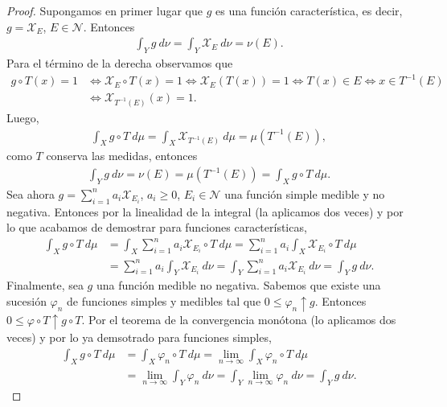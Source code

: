 \begin{proof}
    Supongamos en primer lugar que $g$ es una función característica, es decir, $g = \mathcal{X}_E$, $E \in \mathcal{N}$. Entonces
    \begin{align*}
        \int_{Y}{g \ d\nu} = \int_{Y}{\mathcal{X}_E \ d\nu} = \nu(E).
    \end{align*}
    Para el término de la derecha observamos que
    \begin{align*}
        g \circ T(x) = 1 & \Leftrightarrow \mathcal{X}_E \circ T(x) = 1 \Leftrightarrow \mathcal{X}_E(T(x)) = 1 \Leftrightarrow T(x) \in E \Leftrightarrow x \in T^{-1}(E) \\
                         & \Leftrightarrow \mathcal{X}_{T^{-1}(E)}(x) = 1.
    \end{align*}
    Luego,
    \begin{align*}
        \int_{X}{g \circ T \ d\mu} = \int_{X}{\mathcal{X}_{T^{-1}(E)} \ d\mu} = \mu(T^{-1}(E)),
    \end{align*}
    como $T$ conserva las medidas, entonces
    \begin{align*}
        \int_{Y}{g \ d\nu}  = \nu(E) = \mu(T^{-1}(E)) = \int_{X}{g \circ T \ d\mu}.
    \end{align*}
    Sea ahora $g = \sum_{i=1}^{n}{a_i\mathcal{X}_{E_i}}$, $a_i \ge 0$, $E_i \in \mathcal{N}$ una función simple medible y no negativa. Entonces por la linealidad de la integral (la aplicamos dos veces) y por lo que acabamos de demostrar para funciones características,
    \begin{align*}
        \int_{X}{g \circ T \ d\mu} & = \int_{X}{\sum_{i=1}^{n}{a_i\mathcal{X}_{E_i}} \circ T \ d\mu} = \sum_{i=1}^{n}{a_i \int_{X}{\mathcal{X}_{E_i} \circ T \ d\mu}}       \\
                                   & = \sum_{i=1}^{n}{a_i \int_{Y}{\mathcal{X}_{E_i}} \ d\nu} = \int_{Y}{\sum_{i=1}^{n}{a_i\mathcal{X}_{E_i}} \ d\nu} = \int_{Y}{g \ d\nu}.
    \end{align*}
    Finalmente, sea $g$ una función medible no negativa. Sabemos que existe una sucesión $\varphi_n$ de funciones simples y medibles tal que $0 \leq \varphi_n \uparrow g$. Entonces $0 \leq \varphi \circ T \uparrow g \circ T$. Por el teorema de la convergencia monótona (lo aplicamos dos veces) y por lo ya demsotrado para funciones simples,
    \begin{align*}
        \int_{X}{g \circ T \ d\mu} & = \int_{X}{\varphi_n \circ T \ d\mu} = \lim_{n \to \infty}{\int_{X}{\varphi_n \circ T} \ d\mu}                            \\
                                   & = \lim_{n \to \infty}{\int_{Y}{\varphi_n} \ d\nu} = \int_{Y}{\lim_{n \to \infty}{\varphi_n} \ d\nu} = \int_{Y}{g \ d\nu}.
    \end{align*}
\end{proof}

